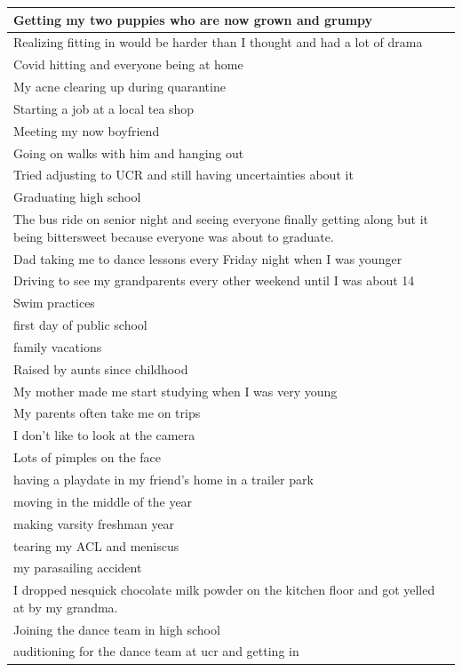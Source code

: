 \documentclass[
  .7em,
  letterpaper,
  DIV=11,
  numbers=noendperiod]{scrartcl}
\begin{document}
\begin{table}
\begin{tabular}{l}
\hline
Getting my two puppies who are now grown and grumpy\\
\hline
Realizing fitting in would be harder than I thought and had a lot of drama\\
\hline
Covid hitting and everyone being at home\\
\hline
My acne clearing up during quarantine\\
\hline
Starting a job at a local tea shop\\
\hline
Meeting my now boyfriend\\
\hline
Going on walks with him and hanging out\\
\hline
Tried adjusting to UCR and still having uncertainties about it\\
\hline
Graduating high school\\
\hline
The bus ride on senior night and seeing everyone finally getting along but it being bittersweet because everyone was about to graduate.\\
\hline
Dad taking me to dance lessons every Friday night when I was younger\\
\hline
Driving to see my grandparents every other weekend until I was about 14\\
\hline
Swim practices\\
\hline
first day of public school\\
\hline
family vacations\\
\hline
Raised by aunts since childhood\\
\hline
My mother made me start studying when I was very young\\
\hline
My parents often take me on trips\\
\hline
I don't like to look at the camera\\
\hline
Lots of pimples on the face\\
\hline
having a playdate in my friend's home in a trailer park\\
\hline
moving in the middle of the year\\
\hline
making varsity freshman year\\
\hline
tearing my ACL and meniscus\\
\hline
my parasailing accident\\
\hline
I dropped nesquick chocolate milk powder on the kitchen floor and got yelled at by my grandma.\\
\hline
Joining the dance team in high school\\
\hline
auditioning for the dance team at ucr and getting in\\

\end{tabular}
\end{table}
\end{document}
